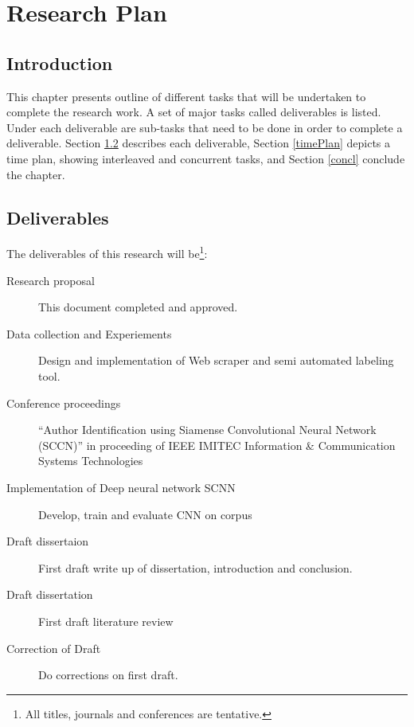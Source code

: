 %
%
%

\chapter{Research Plan}
\section{Introduction}
This chapter presents outline of different tasks that will be undertaken to complete the research work. A set of major tasks called deliverables is listed. Under each deliverable are sub-tasks that need to be done in order to complete a deliverable. Section \ref{deliverables} describes each deliverable, Section \ref{timePlan} depicts a time plan, showing interleaved and concurrent tasks, and Section \ref{concl} conclude the chapter.       

\section{Deliverables} \label{deliverables}

The deliverables of this research will be\footnote{All titles, journals and conferences are tentative.}:
\begin{description}
\item[Research proposal] This document completed and approved. %
\item[Data collection and Experiements] Design and implementation of Web scraper  and semi automated labeling tool.
\item[Conference proceedings] ``Author Identification using Siamense Convolutional Neural Network (SCCN)'' in proceeding of IEEE IMITEC Information \& Communication Systems \/ Technologies 
\item[Implementation of Deep neural network SCNN] Develop, train and evaluate CNN on corpus

\item[Draft dissertaion] First draft write up of dissertation, introduction and conclusion.
\item[Draft dissertation] First draft literature review

\item[Correction of Draft] Do corrections on first draft. 

\end{description}

